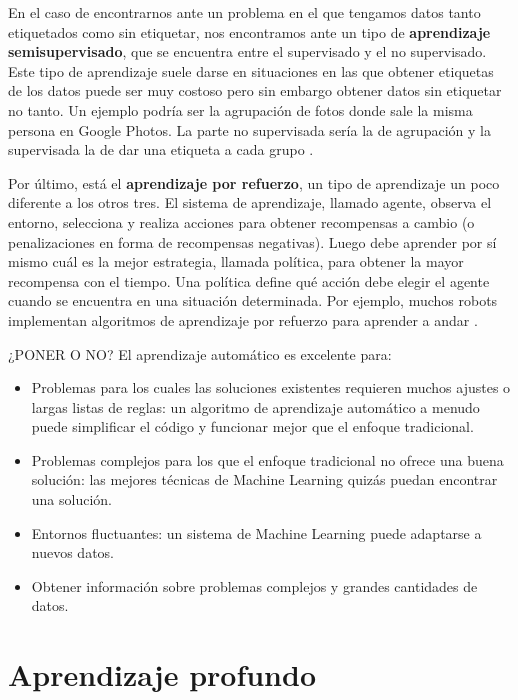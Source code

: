 En el caso de encontrarnos ante un problema en el que tengamos datos tanto etiquetados como sin etiquetar, nos encontramos ante un tipo de \textbf{aprendizaje semisupervisado}, que se encuentra entre el supervisado y el no supervisado. Este tipo de aprendizaje suele darse en situaciones en las que obtener etiquetas de los datos puede ser muy costoso pero sin embargo obtener datos sin etiquetar no tanto. Un ejemplo podría ser la agrupación de fotos donde sale la misma persona en Google Photos. La parte no supervisada sería la de agrupación y la supervisada la de dar una etiqueta a cada grupo \citep{geron2022hands}.


Por último, está el \textbf{aprendizaje por refuerzo}, un tipo de aprendizaje un poco diferente a los otros tres.  El sistema de aprendizaje, llamado agente, observa el entorno, selecciona y realiza acciones para obtener recompensas a cambio (o penalizaciones en forma de recompensas negativas). Luego debe aprender por sí mismo cuál es la mejor estrategia, llamada política, para obtener la mayor recompensa con el tiempo. Una política define qué acción debe elegir el agente cuando se encuentra en una situación determinada. Por ejemplo, muchos robots implementan algoritmos de aprendizaje por refuerzo para aprender a andar \citep{geron2022hands}.






¿PONER O NO?
El aprendizaje automático es excelente para:

\begin{itemize}
\item Problemas para los cuales las soluciones existentes requieren muchos ajustes o largas listas de reglas: un algoritmo de aprendizaje automático a menudo puede simplificar el código y funcionar mejor que el enfoque tradicional.

\item Problemas complejos para los que el enfoque tradicional no ofrece una buena solución: las mejores técnicas de Machine Learning quizás puedan encontrar una solución.

\item Entornos fluctuantes: un sistema de Machine Learning puede adaptarse a nuevos datos.

\item Obtener información sobre problemas complejos y grandes cantidades de datos.
\end{itemize}


\section{Aprendizaje profundo}

